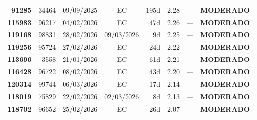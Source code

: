 \documentclass[a4paper,10pt]{article}
\begin{document}
\begin{center}
\begin{longtable}{>{\scriptsize}r>{\scriptsize}r>{\scriptsize}c>{\scriptsize}c>{\scriptsize}r>{\scriptsize}r>{\scriptsize}r>{\scriptsize}l}
\textcolor{anomyellow}{\textbf{91285}} & 34464 & 09/09/2025 & \textcolor{anomorange}{EC} & 195d & \textcolor{anomyellow}{2.28} & --- & \textcolor{anomyellow}{\textbf{MODERADO}} \\

\textcolor{anomyellow}{\textbf{115983}} & 96217 & 04/02/2026 & \textcolor{anomorange}{EC} & 47d & \textcolor{anomyellow}{2.26} & --- & \textcolor{anomyellow}{\textbf{MODERADO}} \\

\textcolor{anomyellow}{\textbf{119168}} & 98831 & 28/02/2026 & 09/03/2026 & 9d & \textcolor{anomyellow}{2.25} & --- & \textcolor{anomyellow}{\textbf{MODERADO}} \\

\textcolor{anomyellow}{\textbf{119256}} & 95724 & 27/02/2026 & \textcolor{anomorange}{EC} & 24d & \textcolor{anomyellow}{2.22} & --- & \textcolor{anomyellow}{\textbf{MODERADO}} \\

\textcolor{anomyellow}{\textbf{113696}} & 3558 & 21/01/2026 & \textcolor{anomorange}{EC} & 61d & \textcolor{anomyellow}{2.21} & --- & \textcolor{anomyellow}{\textbf{MODERADO}} \\

\textcolor{anomyellow}{\textbf{116428}} & 96722 & 08/02/2026 & \textcolor{anomorange}{EC} & 43d & \textcolor{anomyellow}{2.20} & --- & \textcolor{anomyellow}{\textbf{MODERADO}} \\

\textcolor{anomyellow}{\textbf{120314}} & 99744 & 06/03/2026 & \textcolor{anomorange}{EC} & 17d & \textcolor{anomyellow}{2.14} & --- & \textcolor{anomyellow}{\textbf{MODERADO}} \\

\textcolor{anomyellow}{\textbf{118019}} & 75829 & 22/02/2026 & 02/03/2026 & 8d & \textcolor{anomyellow}{2.13} & --- & \textcolor{anomyellow}{\textbf{MODERADO}} \\

\textcolor{anomyellow}{\textbf{118702}} & 96652 & 25/02/2026 & \textcolor{anomorange}{EC} & 26d & \textcolor{anomyellow}{2.07} & --- & \textcolor{anomyellow}{\textbf{MODERADO}} \\

\end{longtable}\end{center}
\end{document}
